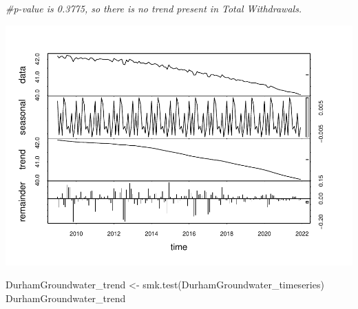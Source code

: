 \documentclass[
  12pt,
]{article}
\newenvironment{Shaded}{\begin{snugshade}}{\end{snugshade}}
\newcommand{\AttributeTok}[1]{\textcolor[rgb]{0.77,0.63,0.00}{#1}}
\newcommand{\CommentTok}[1]{\textcolor[rgb]{0.56,0.35,0.01}{\textit{#1}}}
\newcommand{\DecValTok}[1]{\textcolor[rgb]{0.00,0.00,0.81}{#1}}
\newcommand{\FunctionTok}[1]{\textcolor[rgb]{0.00,0.00,0.00}{#1}}
\newcommand{\NormalTok}[1]{#1}
\newcommand{\OtherTok}[1]{\textcolor[rgb]{0.56,0.35,0.01}{#1}}
\newcommand{\SpecialCharTok}[1]{\textcolor[rgb]{0.00,0.00,0.00}{#1}}
\newcommand{\StringTok}[1]{\textcolor[rgb]{0.31,0.60,0.02}{#1}}
\begin{document}
\begin{Shaded}
\begin{Highlighting}[]
\CommentTok{\#p{-}value is 0.3775, so there is no trend present in Total Withdrawals.}
\end{Highlighting}
\end{Shaded}

\begin{Shaded}
\end{Shaded}

\includegraphics{Project_files/figure-latex/time-series analysis on groundwater-1.pdf}

\begin{Shaded}
\begin{Highlighting}[]
\NormalTok{DurhamGroundwater\_trend }\OtherTok{\textless{}{-}} \FunctionTok{smk.test}\NormalTok{(DurhamGroundwater\_timeseries)}
\NormalTok{DurhamGroundwater\_trend}
\end{Highlighting}
\end{Shaded}
\end{document}
